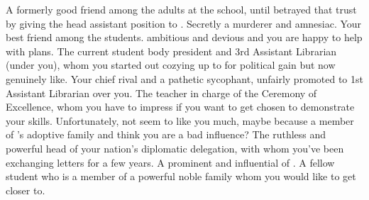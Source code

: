 \documentclass[char]{GL2020}
\begin{document}
\begin{contacts}
    \contact{\cLibrarian{}} A formerly good friend among the adults at the school, until \cLibrarian{\they} betrayed that trust by giving the head assistant position to \cAmbition{}. Secretly a murderer and amnesiac.
    \contact{\cAdopted{}} Your best friend among the students. \cAdopted{\Theyare} ambitious and devious and you are happy to help \cAdopted{\them} with \cAdopted{\their} plans.
    \contact{\cPresident{}} The current student body president and 3rd Assistant Librarian (under you), whom you started out cozying up to for political gain but now genuinely like.
    \contact{\cAmbition{}} Your chief rival and a pathetic sycophant, unfairly promoted to 1st Assistant Librarian over you.
    \contact{\cMusic{}} The teacher in charge of the Ceremony of Excellence, whom you have to impress if you want to get chosen to demonstrate your skills. Unfortunately, \cMusic{\theydo} not seem to like you much, maybe because \cMusic{\theyare} a member of \cAdopted{}’s adoptive family and think\cMusic{\verbs} you are a bad influence?
    \contact{\cEvil{}} The ruthless and powerful head of your nation’s diplomatic delegation, with whom you’ve been exchanging letters for a few years.
    \contact{\cHedonist{}} A prominent and influential \cHedonist{\cleric} of \cFarmGod{}.
    \contact{\cChupStudent{}} A fellow student who is a member of a powerful noble family whom you would like to get closer to.
\end{contacts}
\end{document}
